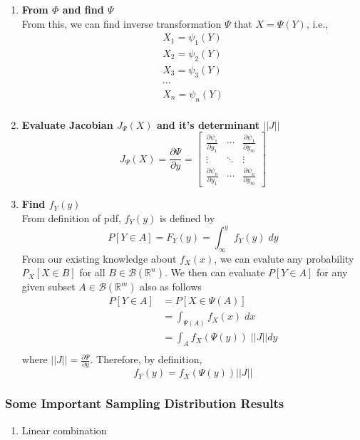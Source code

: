 \documentclass[twoside]{article}
\theoremstyle{definition}
\theoremstyle{remark}
\theoremstyle{remark}
\begin{document}
\begin{enumerate}
  \item \textbf{From $\Phi$ and find $\Psi$} \\
  From this, we can find inverse transformation $\Psi$ that $X = \Psi(Y)$, i.e.,
  \begin{equation*}
    \begin{gathered}
      X_1 = \psi_1 (Y) \\
      X_2 = \psi_2 (Y) \\
      X_3 = \psi_3 (Y) \\
      \cdots           \\
      X_n = \psi_n (Y) \\
    \end{gathered}
  \end{equation*}
  \item \textbf{Evaluate Jacobian $J_{\Psi}(X)$ and it's determinant $||J||$} \\
  \begin{equation*}
    J_{\Psi}(X)
    = \frac{\partial \Psi}{\partial y}
    =
    \begin{bmatrix}
      \frac{\partial \psi_1}{\partial y_1} & \cdots & \frac{\partial \psi_1}{\partial y_m} \\
      \vdots & \ddots & \vdots \\
      \frac{\partial \psi_n}{\partial y_1} & \cdots & \frac{\partial \psi_n}{\partial y_m}
    \end{bmatrix}
  \end{equation*}
  \item \textbf{Find $f_Y(y)$} \\
  From definition of pdf, $f_Y(y)$ is defined by
  \begin{equation*}
    P[Y \in A] = F_Y(y) = \int_{\infty}^{y} f_Y(y) \;dy
  \end{equation*}
  From our existing knowledge about $f_X(x)$, we can evalute any probability
  $P_X[X \in B]$ for all $B \in \mathcal{B}(\mathbb{R}^n)$. We then can
  evaluate $P[Y \in A]$ for any given subset $A \in \mathcal{B}(\mathbb{R}^m)$
  also as follows
  \begin{equation*}
    \begin{split}
      P[Y \in A]
      &= P[X \in \Psi(A)] \\
      &= \int_{\Psi(A)} f_X(x) \;dx \\
      &= \int_{A} f_X(\Psi(y)) \; ||J||dy \\
    \end{split}
  \end{equation*}
  where $||J||=\frac{\partial \Psi}{\partial y}$. Therefore, by definition,
  \begin{equation*}
    f_Y(y) = f_X(\Psi(y)) ||J||
  \end{equation*}
\end{enumerate}




\subsubsection{Some Important Sampling Distribution Results}
\begin{enumerate}
  \item Linear combination
\end{enumerate}

\printbibliography

\end{document}
